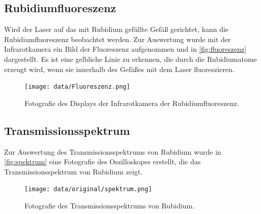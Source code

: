 
\subsection{Rubidiumfluoreszenz}
\label{subsec:Rubidiumfluoreszenz}

Wird der Laser auf das mit Rubidium gefüllte Gefäß gerichtet, kann die Rubidiumfluoreszenz beobachtet werden. Zur Auswertung wurde mit der Infrarotkamera ein Bild der Fluoreszenz aufgenommen und
in \autoref{fig:fluoreszenz} dargestellt. Es ist eine gelbliche Linie zu erkennen, die durch die Rubidiumatome erzeugt wird, wenn sie innerhalb des Gefäßes mit dem Laser fluoreszieren.

\begin{figure}[H]
  \centering
  \texttt{[image: data/Fluoreszenz.png]}
  \caption{Fotografie des Displays der Infrarotkamera der Rubidiumfluoreszenz.}
  \label{fig:fluoreszenz}
\end{figure}

\subsection{Transmissionsspektrum}
\label{subsec:Transmissionsspektrum}

Zur Auswertung des Transmissionsspektrums von Rubidium wurde in \autoref{fig:spektrum} eine Fotografie des Oszilloskopes erstellt, die das Transmissionsspektrum von Rubidium zeigt.

\begin{figure}[H]
  \centering
  \texttt{[image: data/original/spektrum.png]}
  \caption{Fotografie des Transmissionsspektrums von Rubidium.}
  \label{fig:spektrum}
\end{figure}